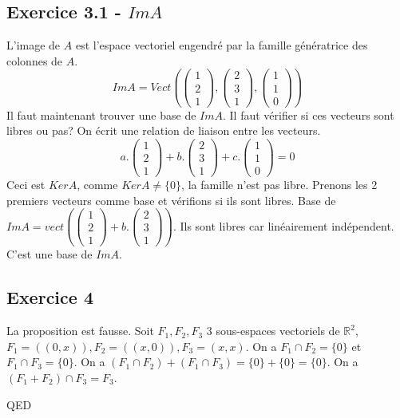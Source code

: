 \documentclass[]{book}
\theoremstyle{definition}
\newcommand{\bb}[1]{\mathbb{#1}}
\newcommand{\R}{\bb{R}}
\begin{document}
\subsection*{Exercice 3.1 - $Im A$}
L'image de $A$ est l'espace vectoriel engendr\'e par la famille g\'en\'eratrice des colonnes de $A$.
$$Im A =  Vect(\begin{pmatrix} 1 \\ 2 \\ 1 \end{pmatrix},\begin{pmatrix} 2 \\ 3 \\ 1 \end{pmatrix},\begin{pmatrix} 1 \\ 1 \\ 0 \end{pmatrix})$$
Il faut maintenant trouver une base de $Im A$.
Il faut v\'erifier si ces vecteurs sont libres ou pas? On \'ecrit une relation de liaison entre les vecteurs.
$$a.\begin{pmatrix}1\\2\\1\end{pmatrix} + b.\begin{pmatrix}2\\3\\1\end{pmatrix} + c.\begin{pmatrix}1\\1\\0\end{pmatrix} = 0$$
Ceci est $Ker A$, comme $Ker A \neq \{0\}$, la famille n'est pas libre. Prenons les 2 premiers vecteurs comme base et v\'erifions si ils sont libres.
Base de $Im A = vect(\begin{pmatrix}1\\2\\1\end{pmatrix} + b.\begin{pmatrix}2\\3\\1\end{pmatrix})$. Ils sont libres car lin\'eairement ind\'ependent. C'est une base de $Im A$.



\subsection*{Exercice 4}
La proposition est fausse. Soit $F_1,F_2,F_3$ 3 sous-espaces vectoriels de $\R^2$, $F_1=((0,x)), F_2=((x,0)), F_3=(x,x)$. On a $F_1 \cap F_2 = \{0\}$ et $F_1 \cap F_3 = \{0\}$. On a $(F_1 \cap F_2) + (F_1 \cap F_3) = \{0\} + \{0\} = \{0\}$. On a $(F_1 + F_2) \cap F_3 = F_3$.


QED
\end{document}
